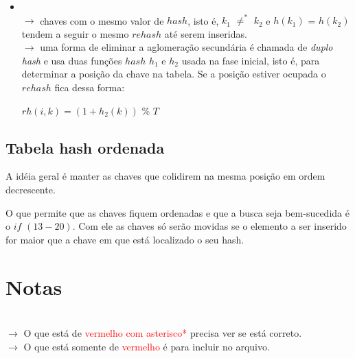 \documentclass[a4paper, 12pt]{article}
\begin{document}
\begin{itemize}
\begin{itemize}
\item {}\\
$\rightarrow$ chaves com o mesmo valor de $hash$, isto é, $k_{1}$ $\neq^*$ $k_{2}$ e $h(k_{1})$ = $h(k_{2})$ tendem a seguir o mesmo $rehash$ até serem inseridas.\\
$\rightarrow$ uma forma de eliminar a aglomeração secundária é chamada de \emph{duplo hash} e usa duas funções $hash$ $h_{1}$ e $h_{2}$ usada na fase inicial, isto é, para determinar a posição da chave na tabela. Se a posição estiver ocupada o $rehash$ fica dessa forma:
\begin{center}
$rh(i, k) = (1 + h_{2}(k))$ $\%$ $T$
\end{center}
\end{itemize}

\end{itemize}
\pagebreak

\subsection{Tabela hash ordenada}

A idéia geral é manter as chaves que colidirem na mesma posição em ordem decrescente.

\begin{algorithmic}[1]
\EndWhile
{}
	\color{BlueViolet}
		\color{black}
		\EndIf
	\color{BlueViolet}
	\EndIf
	\color{black}
	
\EndWhile
{}
\EndIf
{}
	\State {}
\Else
	\State {}
\EndIf

\end{algorithmic}

O que permite que as chaves fiquem ordenadas e que a busca seja bem-sucedida é o $if$ $(13-20)$. Com ele as chaves só serão movidas se o elemento a ser inserido for maior que a chave em que está localizado o seu hash.
\pagebreak

\section{Notas}
\textcolor{white}{.}\\
$\rightarrow$ O que está de \textcolor{red}{vermelho com asterisco*} precisa ver se está correto.\\
$\rightarrow$ O que está somente de \textcolor{red}{vermelho} é para incluir no arquivo.
\end{document}
